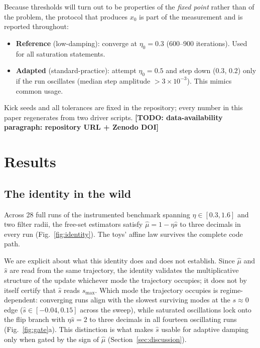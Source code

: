 \documentclass[11pt,a4paper]{article}
\newcommand{\smax}{s_{\max}}
\newcommand{\todo}[1]{\textbf{[TODO: #1]}}
\begin{document}
Because thresholds will turn out to be properties of the \emph{fixed
point} rather than of the problem, the protocol that produces $x_0$ is
part of the measurement and is reported throughout:

\begin{itemize}
\item \textbf{Reference} (low-damping): converge at $\eta_0=0.3$
  (600--900 iterations). Used for all saturation statements.
\item \textbf{Adapted} (standard-practice): attempt $\eta_0=0.5$ and step
  down ($0.3$, $0.2$) only if the run oscillates (median step amplitude
  $>3\times10^{-3}$). This mimics common usage.
\end{itemize}

Kick seeds and all tolerances are fixed in the repository; every number in
this paper regenerates from two driver scripts.
\todo{data-availability paragraph: repository URL + Zenodo DOI}

\section{Results}\label{sec:results}

\subsection{The identity in the wild}\label{sec:identity}

Across 28 full runs of the instrumented benchmark spanning
$\eta\in[0.3,1.6]$ and two filter radii, the free-set estimators satisfy
$\hat\mu=1-\eta\hat s$ to three decimals in every run
(Fig.~\ref{fig:identity}). The toys' affine law survives the complete code
path.

We are explicit about what this identity does and does not establish.
Since $\hat\mu$ and $\hat s$ are read from the same trajectory, the
identity validates the multiplicative structure of the update whichever
mode the trajectory occupies; it does not by itself certify that
$\hat s$ reads $\smax$. Which mode the trajectory occupies is
regime-dependent: converging runs align with the slowest surviving modes
at the $s\approx0$ edge ($\hat s\in[-0.04,0.15]$ across the sweep), while
saturated oscillations lock onto the flip branch with $\eta\hat s=2$ to
three decimals in all fourteen oscillating runs (Fig.~\ref{fig:gate}a).
This distinction is what makes $\hat s$ usable for adaptive damping only
when gated by the sign of $\hat\mu$ (Section~\ref{sec:discussion}).
\end{document}
